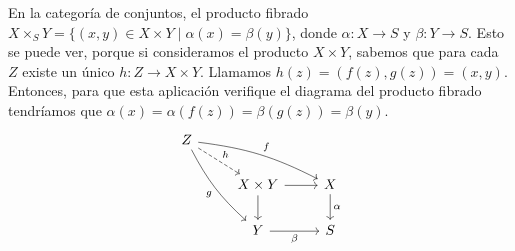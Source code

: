 \documentclass[GA.tex]{subfiles}
\begin{document}
\begin{ej}
En la categoría de conjuntos, el producto fibrado $X\times_{S} Y=\{(x,y)\in X\times Y\mid \alpha(x)=\beta(y)\}$, donde $\alpha:X\to S$ y $\beta:Y\to S$. Esto se puede ver, porque si consideramos el producto $X\times Y$, sabemos que para cada $Z$ existe un único $h:Z\to X\times Y$. Llamamos $h(z)=(f(z),g(z))=(x,y)$. Entonces, para que esta aplicación verifique el diagrama del producto fibrado tendríamos que $\alpha(x)=\alpha(f(z))=\beta(g(z))=\beta(y)$. 
\[
\begin{tikzcd}
Z\arrow[dr, dashed, "h"]\arrow[drr, bend left=10, "f"]\arrow[ddr, bend right=10, "g"'] & &\\ 
& X\times Y\arrow[r]\arrow[d] & X\arrow[d, "\alpha"]\\
& Y\arrow[r, "\beta"'] & S
\end{tikzcd}
\]
\end{ej}
\end{document}

